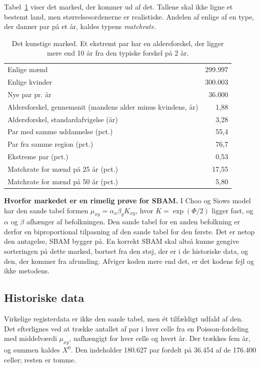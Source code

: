 \documentclass[11pt,a4paper]{article}
\begin{document}
Tabel~\ref{tab:marked} viser det marked, der kommer ud af det. Tallene skal ikke ligne et bestemt
land, men størrelsesordenerne er realistiske. Andelen af enlige af en type, der danner par på et år,
kaldes typens \emph{matchrate}.

\begin{table}[ht]
\centering
\caption{Det kunstige marked. Et ekstremt par har en aldersforskel, der ligger mere end 10 år fra den
typiske forskel på 2 år.}
\label{tab:marked}
\begin{tabular}{@{}lr@{}}
\toprule
Enlige mænd & 299.997 \\
Enlige kvinder & 300.003 \\
Nye par pr. år & 36.000 \\
Aldersforskel, gennemsnit (mandens alder minus kvindens, år) & 1,88 \\
Aldersforskel, standardafvigelse (år) & 3,28 \\
Par med samme uddannelse (pct.) & 55,4 \\
Par fra samme region (pct.) & 76,7 \\
Ekstreme par (pct.) & 0,53 \\
Matchrate for mænd på 25 år (pct.) & 17,55 \\
Matchrate for mænd på 50 år (pct.) & 5,80 \\
\bottomrule
\end{tabular}
\end{table}

\textbf{Hvorfor markedet er en rimelig prøve for SBAM.} I Choo og Siows model har den sande tabel
formen $\mu_{xy}=\alpha_x\beta_yK_{xy}$, hvor $K=\exp(\Phi/2)$ ligger fast, og $\alpha$ og $\beta$
afhænger af befolkningen. Den sande tabel for en anden befolkning er derfor en biproportional
tilpasning af den sande tabel for den første. Det er netop den antagelse, SBAM bygger på. En korrekt
SBAM skal altså kunne gengive sorteringen på dette marked, bortset fra den støj, der er i de
historiske data, og den, der kommer fra afrunding. Afviger koden mere end det, er det kodens fejl og
ikke metodens.

\subsection{Historiske data}

Virkelige registerdata er ikke den sande tabel, men ét tilfældigt udfald af den. Det efterlignes ved
at trække antallet af par i hver celle fra en Poisson-fordeling med middelværdi $\mu_{xy}$,
uafhængigt for hver celle og hvert år. Der trækkes fem år, og summen kaldes $X^0$. Den indeholder
180.627 par fordelt på 36.454 af de 176.400 celler; resten er tomme.
\end{document}
